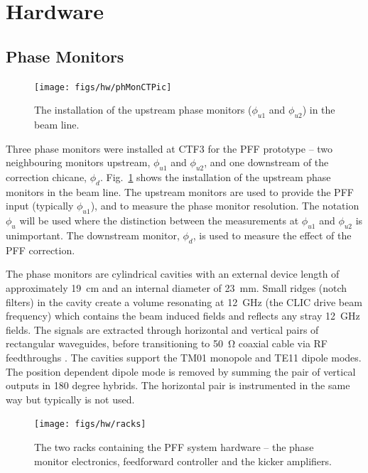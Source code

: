 \documentclass[%
 reprint,
 superscriptaddress,
 amsmath,
 amssymb,
 prstab,
]{revtex4-1}
\begin{document}
\section{\label{s:hw}Hardware}

\subsection{\label{ss:phMon}Phase Monitors}

\begin{figure}
	\texttt{[image: figs/hw/phMonCTPic]}
	\caption{\label{f:phMonCTPic}The installation of the upstream phase 
		monitors (\(\phi_{u1}\) and \(\phi_{u2}\)) in the beam line.}
\end{figure}

Three phase monitors were installed at CTF3 for the PFF prototype -- two 
neighbouring monitors upstream, \(\phi_{u1}\) and \(\phi_{u2}\), and one 
downstream of the correction chicane, \(\phi_{d}\). Fig.~\ref{f:phMonCTPic} 
shows the installation of the upstream phase monitors 
in the beam line. The upstream monitors are 
used to provide the PFF input (typically \(\phi_{u1}\)), and to measure the 
phase monitor resolution. The notation \(\phi_u\) 
will be used where the distinction between the measurements at \(\phi_{u1}\) 
and \(\phi_{u2}\) is unimportant. The downstream monitor, \(\phi_{d}\), is used 
to measure the effect of the PFF correction.

The phase monitors are cylindrical cavities with an external device length of 
approximately 19~cm and an internal diameter of 23~mm. Small ridges (notch 
filters) in the cavity create 
a volume resonating at 12~GHz (the CLIC drive beam frequency) which contains 
the beam induced fields and reflects any stray 12~GHz fields. The signals are 
extracted through horizontal and vertical pairs of rectangular waveguides, 
before transitioning to 50~\(\mathrm{\Omega}\) coaxial cable via RF 
feedthroughs \cite{phMonIPAC10}. The cavities support the TM01 monopole and 
TE11 dipole modes. The position dependent dipole mode is removed by summing the 
pair of vertical outputs in 180 degree hybrids. The horizontal pair is 
instrumented in the same way but typically is not used. 

\begin{figure}
	\texttt{[image: figs/hw/racks]}%
	\caption{\label{f:racks}The two racks containing the PFF system hardware -- 
		the phase monitor electronics, feedforward controller and the kicker 
		amplifiers.}
\end{figure}
\end{document}
